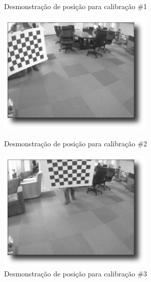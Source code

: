 \begin{figure}[!htb]
  \caption{Desmonstração de posição para calibração \#1}\label{fig3:14}
  \includegraphics[width=\linewidth]{Imagens/figura3-14.png}
\endminipage\hfill
{}
  \caption{Desmonstração de posição para calibração \#2}\label{fig3:15}
  \includegraphics[width=\linewidth]{Imagens/figura3-15.png}
\endminipage\hfill
{}
  \caption{Desmonstração de posição para calibração \#3}\label{fig3:16}

\end{figure}
